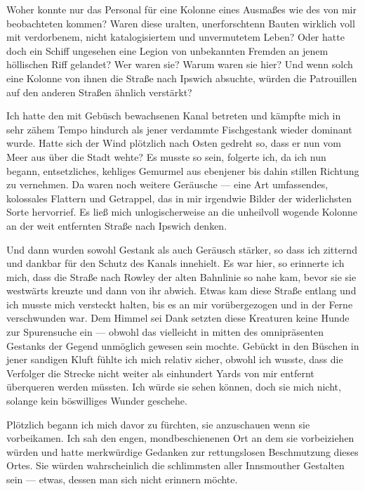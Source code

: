 Woher konnte nur das Personal für eine Kolonne eines Ausmaßes wie des von mir beobachteten kommen? Waren diese uralten, unerforschtenn Bauten wirklich voll mit verdorbenem, nicht katalogisiertem und unvermutetem Leben? Oder hatte doch ein Schiff ungesehen eine Legion von unbekannten Fremden an jenem höllischen Riff gelandet? Wer waren sie? Warum waren sie hier? Und wenn solch eine Kolonne von ihnen die Straße nach Ipswich absuchte, würden die Patrouillen auf den anderen Straßen ähnlich verstärkt?

Ich hatte den mit Gebüsch bewachsenen Kanal betreten und kämpfte mich in sehr zähem Tempo hindurch als jener verdammte Fischgestank wieder dominant wurde. Hatte sich der Wind plötzlich nach Osten gedreht so, dass er nun vom Meer aus über die Stadt wehte? Es musste so sein, folgerte ich, da ich nun begann, entsetzliches, kehliges Gemurmel aus ebenjener bis dahin stillen Richtung zu vernehmen. Da waren noch weitere Geräusche --- eine Art umfassendes, kolossales Flattern und Getrappel, das in mir irgendwie Bilder der widerlichsten Sorte hervorrief. Es ließ mich unlogischerweise an die unheilvoll wogende Kolonne an der weit entfernten Straße nach Ipswich denken.

Und dann wurden sowohl Gestank als auch Geräusch stärker, so dass ich zitternd und dankbar für den Schutz des Kanals innehielt. Es war hier, so erinnerte ich mich, dass die Straße nach Rowley der alten Bahnlinie so nahe kam, bevor sie sie westwärts kreuzte und dann von ihr abwich. Etwas kam diese Straße entlang und ich musste mich versteckt halten, bis es an mir vorübergezogen und in der Ferne verschwunden war. Dem Himmel sei Dank setzten diese Kreaturen keine Hunde zur Spurensuche ein --- obwohl das vielleicht in mitten des omnipräsenten Gestanks der Gegend unmöglich gewesen sein mochte. Gebückt in den Büschen in jener sandigen Kluft fühlte ich mich relativ sicher, obwohl ich wusste, dass die Verfolger die Strecke nicht weiter als einhundert Yards von mir entfernt überqueren werden müssten. Ich würde sie sehen können, doch sie mich nicht, solange kein böswilliges Wunder geschehe.

Plötzlich begann ich mich davor zu fürchten, sie anzuschauen wenn sie vorbeikamen. Ich sah den engen, mondbeschienenen Ort an dem sie vorbeiziehen würden und hatte merkwürdige Gedanken zur rettungslosen Beschmutzung dieses Ortes. Sie würden wahrscheinlich die schlimmsten aller Innsmouther Gestalten sein --- etwas, dessen man sich nicht erinnern möchte.

